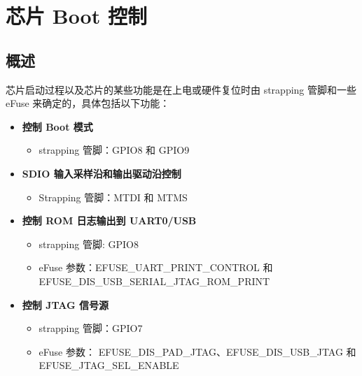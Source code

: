 \documentclass[main\_\_CN.tex]{subfiles}
\begin{document}

\ifglobal
\else
    \listoftodos
    {\let\clearpage\relax \listofdonetodos}
    \tableofcontents
\fi




\hypertarget{bootctrl}{}
\chapter{芯片 Boot 控制}
\label{mod:bootctrl}

\section{概述}

芯片启动过程以及芯片的某些功能是在上电或硬件复位时由 strapping 管脚和一些 eFuse 来确定的，具体包括以下功能：


\begin{itemize}
    \item \textbf{控制 Boot 模式}
    \begin{itemize}
        \item strapping 管脚：GPIO8 和 GPIO9
    \end{itemize}
    \item \textbf{SDIO 输入采样沿和输出驱动沿控制}
        \begin{itemize}
            \item Strapping 管脚：MTDI 和 MTMS
        \end{itemize}%
    \item \textbf{控制 ROM 日志输出到 UART0/USB}
    \begin{itemize}
        \item strapping 管脚: GPIO8
        \item eFuse 参数：EFUSE\_UART\_PRINT\_CONTROL 和 EFUSE\_DIS\_USB\_SERIAL\_JTAG\_ROM\_PRINT
    \end{itemize}
    \item \textbf{控制 JTAG 信号源}
    \begin{itemize}
        \item strapping 管脚：GPIO7
        \item eFuse 参数：
            EFUSE\_DIS\_PAD\_JTAG、EFUSE\_DIS\_USB\_JTAG 和 EFUSE\_JTAG\_SEL\_ENABLE
    \end{itemize}
\end{itemize}
\end{document}
